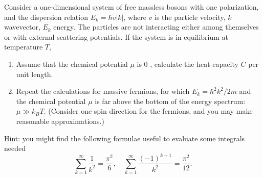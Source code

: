 \begin{exercise}
\label{physics:2023:4}
Consider a one-dimensional system of free massless bosons with one polarization, and the dispersion relation $E _ { k } = \hbar v | k |$, where $v$ is the particle velocity, $k$ wavevector, $E_k$ energy. The particles are not interacting either among themselves or with external scattering potentials. If the system is in equilibrium at temperature $T$,

\begin{enumerate}[label=(\alph*)]
    \item Assume that the chemical potential $\mu$ is $0$ , calculate the heat capacity $C$ per unit length.
    \item Repeat the calculations for massive fermions, for which $E _ { k } = \hbar ^ { 2 } k ^ { 2 } / 2 m$ and the chemical potential $\mu$ is far above the bottom of the energy spectrum: $\mu \gg k_B T$. (Consider one spin direction for the fermions, and you may make reasonable approximations.)
\end{enumerate}

Hint: you might find the following formulae useful to evaluate some integrals needed
\begin{equation}
    \sum_{k=1}^\infty \frac{1}{k^2} = \frac{\pi^2}{6}, \quad \sum_{k=1}^\infty \frac{(-1)^{k+1}}{k^2} = \frac{\pi^2}{12}. \label{eq:2023:4:8}
\end{equation}
\end{exercise}

